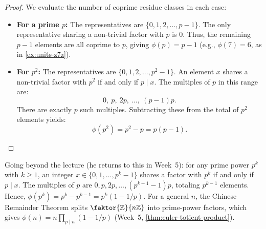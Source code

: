 \begin{content}


\begin{proof}
We evaluate the number of coprime residue classes in each case:
\begin{itemize}
    \item \textbf{For a prime $p$:} The representatives are $\{0, 1, 2, \dots, p - 1\}$. The only representative sharing a non-trivial factor with $p$ is $0$. Thus, the remaining $p - 1$ elements are all coprime to $p$, giving $\phi(p) = p - 1$ (e.g., $\phi(7) = 6$, as in \cref{ex:units-z7z}).
    \item \textbf{For $p^2$:} The representatives are $\{0, 1, 2, \dots, p^2 - 1\}$. An element $x$ shares a non-trivial factor with $p^2$ if and only if $p \mid x$. The multiples of $p$ in this range are:
    \[
    0, \ p, \ 2p, \ \dots, \ (p - 1)p.
    \]
    There are exactly $p$ such multiples. Subtracting these from the total of $p^2$ elements yields:
    \[
    \phi(p^2) = p^2 - p = p(p - 1).
    \]
\end{itemize}
\end{proof}

\begin{steps}
Going beyond the lecture (he returns to this in Week~5): for any prime power $p^k$ with $k \ge 1$, an integer $x \in \{0, 1, \dots, p^k - 1\}$ shares a factor with $p^k$ if and only if $p \mid x$. The multiples of $p$ are $0, p, 2p, \dots, (p^{k-1}-1)p$, totaling $p^{k-1}$ elements. Hence, $\phi(p^k) = p^k - p^{k-1} = p^k (1 - 1/p)$. For a general $n$, the Chinese Remainder Theorem splits $\faktor{\mathbb{Z}}{n\mathbb{Z}}$ into prime-power factors, which gives $\phi(n) = n \prod_{p \mid n} (1 - 1/p)$ (Week~5, \cref{thm:euler-totient-product}).
\end{steps}
\end{content}

